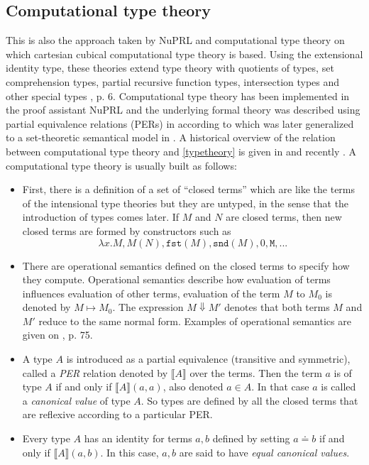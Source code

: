 \documentclass[12pt,a4paper,twoside,xetex]{book} %
\newcommand{\keyword}[1]{\emph{#1}\index{#1}}
\begin{document}
\subsection{Computational type theory}

This is also the approach taken by NuPRL and computational type theory on which 
cartesian cubical computational type theory is based. Using the extensional 
identity type, these theories extend type theory with quotients of types, set 
comprehension types, partial recursive function types, intersection types and 
other special types \cite{Constable2011}, p. 6.  Computational type theory has 
been implemented in the proof assistant NuPRL and the underlying formal theory 
was described using partial equivalence relations (PERs) in \cite{Allen1987} 
according to \cite{Angiuli2018} which was later generalized to a set-theoretic semantical model in 
\cite{Harper1991}. A historical overview of the relation between computational type theory and \cref{typetheory} is given in \cite{Constable2003} and recently 
\cite{Constable2015July}. A computational type theory is usually built as 
follows:

\begin{itemize}
 \item First, there is a definition of a set of ``closed terms'' which are like 
the terms of the intensional type theories but they are untyped, in the sense 
that the introduction of types comes later. If $M$ and $N$ are closed terms, 
then new closed terms are formed by constructors such as $$\lambda x . M, M (N), 
\texttt{fst}(M), \texttt{snd}(M), 0, \texttt{M}, ...$$ 
 
 \item There are operational semantics defined on the closed terms to specify 
how they compute. Operational semantics describe how evaluation of terms 
influences evaluation of other terms, evaluation of the term $M$ to $M_0$ is 
denoted by $M \mapsto M_0$. The expression $M \Downarrow M'$ denotes that both 
terms $M$ and $M'$ reduce to the same normal form. Examples of operational 
semantics are given on \cite{Harper1991}, p. 75.
 
 \item A type $A$ is introduced as a partial equivalence (transitive and 
symmetric), called a \keyword{PER} relation denoted by $\llbracket A \rrbracket$ 
over the terms. Then the term $a$ is of type $A$ if and only if $\llbracket A 
\rrbracket (a,a)$, also denoted $a \in A$. In that case $a$ is called a 
\keyword{canonical value} of type $A$. So types are defined by all the closed 
terms that are reflexive according to a particular PER. 
 
 \item Every type $A$ has an identity for terms $a,b$ defined by 
setting $a \doteq b$ if and only if $\llbracket A \rrbracket (a,b)$. In this 
case, $a,b$ are said to have \keyword{equal canonical values}.

\end{itemize}
\end{document}
